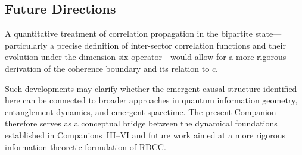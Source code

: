 \documentclass[11pt,a4paper]{article}
\begin{document}
\subsection{Future Directions}

A quantitative treatment of correlation propagation in the bipartite state—particularly a
precise definition of inter-sector correlation functions and their evolution under the
dimension-six operator—would allow for a more rigorous derivation of the coherence
boundary and its relation to $c$.

Such developments may clarify whether the emergent causal structure identified here can be
connected to broader approaches in quantum information geometry, entanglement dynamics,
and emergent spacetime. The present Companion therefore serves as a conceptual bridge
between the dynamical foundations established in Companions~III–VI and future work aimed
at a more rigorous information-theoretic formulation of RDCC.
\end{document}
